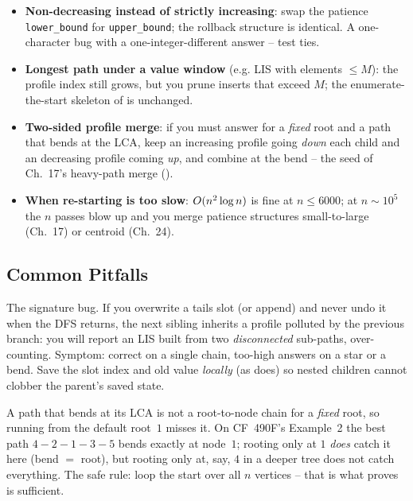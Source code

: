 \begin{itemize}[nosep]
  \item \textbf{Non-decreasing instead of strictly increasing}: swap the
        patience \lstinline{lower_bound} for \lstinline{upper_bound};
        the rollback structure is identical. A one-character bug with a
        one-integer-different answer -- test ties. \hfill{}
  \item \textbf{Longest path under a value window} (e.g. LIS with elements $\le M$):
        the profile index still grows, but you prune inserts that exceed $M$; the
        enumerate-the-start skeleton of  is unchanged. \hfill{}
  \item \textbf{Two-sided profile merge}: if you must answer for a \emph{fixed} root
        and a path that bends at the LCA, keep an increasing profile going \emph{down}
        each child and an decreasing profile coming \emph{up}, and combine at the bend
        -- the seed of Ch.~17's heavy-path merge (). \hfill{}
  \item \textbf{When re-starting is too slow}: $O(n^2\log n)$ is fine at $n\le6000$;
        at $n\sim10^5$ the $n$ passes blow up and you merge patience structures
        small-to-large (Ch.~17) or centroid (Ch.~24). \hfill{}
\end{itemize}

\subsection{Common Pitfalls}

\begin{warningbox}
The signature bug. If you overwrite a tails slot (or append) and never undo it when
the DFS returns, the next sibling inherits a profile polluted by the previous branch:
you will report an LIS built from two \emph{disconnected} sub-paths, over-counting.
Symptom: correct on a single chain, too-high answers on a star or a bend. Save the
slot index and old value \emph{locally} (as  does) so nested
children cannot clobber the parent's saved state.
\end{warningbox}

\begin{warningbox}
A path that bends at its LCA is not a root-to-node chain for a \emph{fixed} root, so
running  from the default root~$1$ misses it. On CF~490F's
Example~2 the best path $4\!-\!2\!-\!1\!-\!3\!-\!5$ bends exactly at node~$1$; rooting
only at $1$ \emph{does} catch it here (bend $=$ root), but rooting only at, say, $4$
in a deeper tree does not catch everything. The safe rule: loop the start over all $n$
vertices -- that is what  proves is sufficient.
\end{warningbox}


